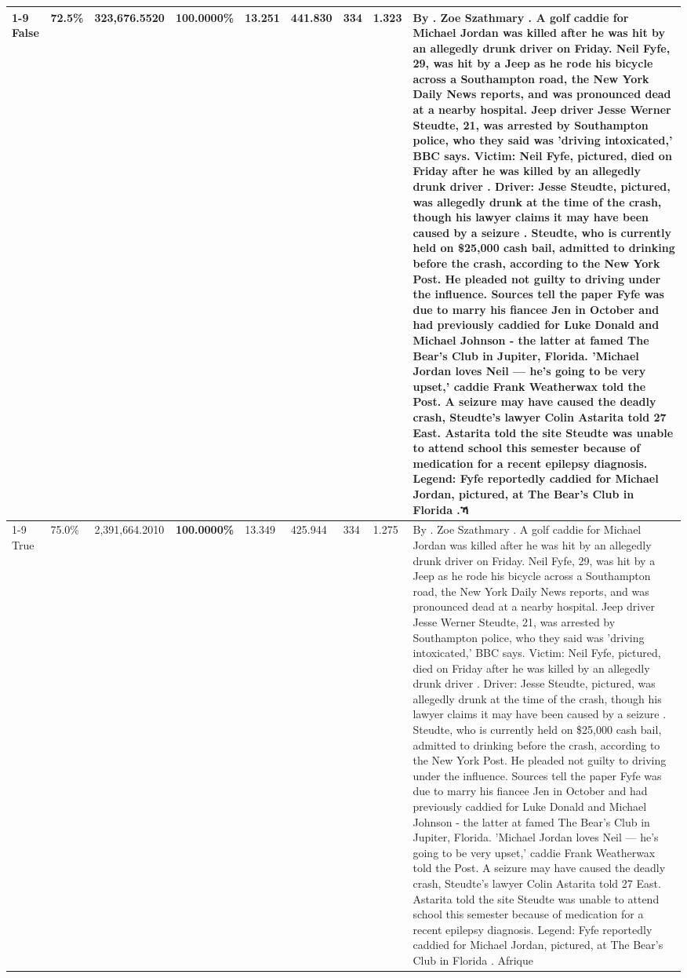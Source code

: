 \begin{table}[H]
\begin{tabular}{lllrlllll}
\cline{1-9}
False & 72.5\% & 323,676.5520 & \bfseries \color{red} 100.0000\% & 13.251 & 441.830 & 334 & 1.323 & By . Zoe Szathmary . A golf caddie for Michael Jordan was killed after he was hit by an allegedly drunk driver on Friday. Neil Fyfe, 29, was hit by a Jeep as he rode his bicycle across a Southampton road, the New York Daily News reports, and was pronounced dead at a nearby hospital. Jeep driver Jesse Werner Steudte, 21, was arrested by Southampton police, who they said was 'driving intoxicated,' BBC says. Victim: Neil Fyfe, pictured, died on Friday after he was killed by an allegedly drunk driver . Driver: Jesse Steudte, pictured, was allegedly drunk at the time of the crash, though his lawyer claims it may have been caused by a seizure . Steudte, who is currently held on \$25,000 cash bail, admitted to drinking before the crash, according to the New York Post. He pleaded not guilty to driving under the influence. Sources tell the paper Fyfe was due to marry his fiancee Jen in October and had previously caddied for Luke Donald and Michael Johnson - the latter at famed The Bear's Club in Jupiter, Florida. 'Michael Jordan loves Neil — he’s going to be very upset,' caddie Frank Weatherwax told the Post. A seizure may have caused the deadly crash, Steudte's lawyer Colin Astarita told 27 East. Astarita told the site Steudte was unable to attend school this semester because of medication for a recent epilepsy diagnosis. Legend: Fyfe reportedly caddied for Michael Jordan, pictured, at The Bear's Club in Florida .ኻ \\
\cline{1-9}
True & 75.0\% & 2,391,664.2010 & \bfseries \color{red} 100.0000\% & 13.349 & 425.944 & 334 & 1.275 & By . Zoe Szathmary . A golf caddie for Michael Jordan was killed after he was hit by an allegedly drunk driver on Friday. Neil Fyfe, 29, was hit by a Jeep as he rode his bicycle across a Southampton road, the New York Daily News reports, and was pronounced dead at a nearby hospital. Jeep driver Jesse Werner Steudte, 21, was arrested by Southampton police, who they said was 'driving intoxicated,' BBC says. Victim: Neil Fyfe, pictured, died on Friday after he was killed by an allegedly drunk driver . Driver: Jesse Steudte, pictured, was allegedly drunk at the time of the crash, though his lawyer claims it may have been caused by a seizure . Steudte, who is currently held on \$25,000 cash bail, admitted to drinking before the crash, according to the New York Post. He pleaded not guilty to driving under the influence. Sources tell the paper Fyfe was due to marry his fiancee Jen in October and had previously caddied for Luke Donald and Michael Johnson - the latter at famed The Bear's Club in Jupiter, Florida. 'Michael Jordan loves Neil — he’s going to be very upset,' caddie Frank Weatherwax told the Post. A seizure may have caused the deadly crash, Steudte's lawyer Colin Astarita told 27 East. Astarita told the site Steudte was unable to attend school this semester because of medication for a recent epilepsy diagnosis. Legend: Fyfe reportedly caddied for Michael Jordan, pictured, at The Bear's Club in Florida . Afrique \\

\end{tabular}
\end{table}
